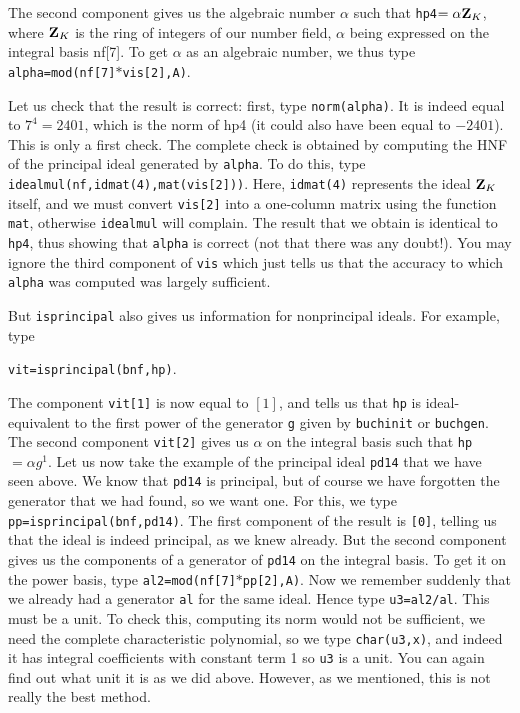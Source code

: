 The second component gives us the algebraic number $\alpha$ such that
{\tt hp4$=\alpha{\bf Z}_K$}, where ${\bf Z}_K$ is the ring of integers of our number
field, $\alpha$ being expressed on the integral basis nf[7]. To get $\alpha$
as an algebraic number, we thus type {\tt alpha=mod(nf[7]$*$vis[2],A)}.

Let us check that the result is correct: first, type {\tt norm(alpha)}.
It is indeed equal to $7^4=2401$, which is the norm of hp4 (it could also
have been equal to $-2401$). This is only a first check. The complete check
is obtained by computing the HNF of the principal ideal generated by 
{\tt alpha}. To do this, type {\tt idealmul(nf,idmat(4),mat(vis[2]))}.
Here, {\tt idmat(4)} represents the ideal ${\bf Z}_K$ itself, and we must convert
{\tt vis[2]} into a one-column matrix using the function {\tt mat}, otherwise
{\tt idealmul} will complain. The result that we obtain is identical to
{\tt hp4}, thus showing that {\tt alpha} is correct (not that there was any
doubt!). You may ignore the third component of {\tt vis} which just tells us
that the accuracy to which {\tt alpha} was computed was largely sufficient.

But {\tt isprincipal} also gives us information for nonprincipal ideals.
For example, type 

{\tt vit=isprincipal(bnf,hp)}.

The component {\tt vit[1]}
is now equal to $[1]$, and tells us that {\tt hp} is ideal-equivalent to
the first power of the generator {\tt g} given by {\tt buchinit} or {\tt buchgen}.
The second component {\tt vit[2]} gives us $\alpha$ on the integral basis
such that {\tt hp$=\alpha g^1$}.
\smallskip
Let us now take the example of the principal ideal {\tt pd14} that we have 
seen above. We know that {\tt pd14} is principal, but of course we have
forgotten the generator that we had found, so we want one. For this,
we type {\tt pp=isprincipal(bnf,pd14)}. The first component of the result is
{\tt [0]}, telling us that the ideal is indeed principal, as we knew already. 
But the second component gives us the components of a generator of {\tt pd14}
on the integral basis. To get it on the power basis, type
{\tt al2=mod(nf[7]$*$pp[2],A)}. Now we remember suddenly that we already
had a generator {\tt al} for the same ideal. Hence type {\tt u3=al2/al}.
This must be a unit. To check this, computing its norm would not be
sufficient, we need the complete characteristic polynomial, so we type
{\tt char(u3,x)}, and indeed it has integral coefficients with constant term 1
so {\tt u3} is a unit. You can again find out what unit it is as we did above.
However, as we mentioned, this is not really the best method.

